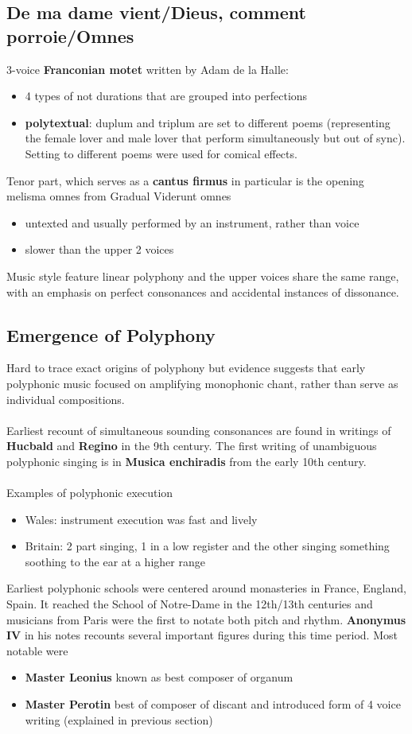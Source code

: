 \documentclass{article}
\begin{document}
  \subsection{De ma dame vient/Dieus, comment porroie/Omnes}
  3-voice \textbf{Franconian motet} written by Adam de la Halle:
  \begin{itemize}
    \item 4 types of not durations that are grouped into perfections
    \item \textbf{polytextual}: duplum and triplum are set to different poems (representing the female lover and male lover that perform simultaneously but out of sync). Setting to different poems were used for comical effects. \\
  \end{itemize}
  Tenor part, which serves as a \textbf{cantus firmus} in particular is the opening melisma omnes from Gradual Viderunt omnes
  \begin{itemize}
    \item untexted and usually performed by an instrument, rather than voice
    \item slower than the upper 2 voices
  \end{itemize}
  Music style feature linear polyphony and the upper voices share the same range, with an emphasis on perfect consonances and accidental instances of dissonance.
  \subsection{Emergence of Polyphony}
  Hard to trace exact origins of polyphony but evidence suggests that early polyphonic music focused on amplifying monophonic chant, rather than serve as individual compositions. \\ \\
  Earliest recount of simultaneous sounding consonances are found in writings of \textbf{Hucbald} and \textbf{Regino} in the 9th century. The first writing of unambiguous polyphonic singing is in \textbf{Musica enchiradis} from the early 10th century. \\ \\
  Examples of polyphonic execution
  \begin{itemize}
    \item Wales: instrument execution was fast and lively 
    \item Britain: 2 part singing, 1 in a low register and the other singing something soothing to the ear at a higher range
  \end{itemize}
  Earliest polyphonic schools were centered around monasteries in France, England, Spain. It reached the School of Notre-Dame in the 12th/13th centuries and musicians from Paris were the first to notate both pitch and rhythm. \textbf{Anonymus IV} in his notes recounts several important figures during this time period. Most notable were
  \begin{itemize}
    \item \textbf{Master Leonius} known as best composer of organum
    \item \textbf{Master Perotin} best of composer of discant and introduced form of 4 voice writing (explained in previous section)
  \end{itemize}
\end{document}
